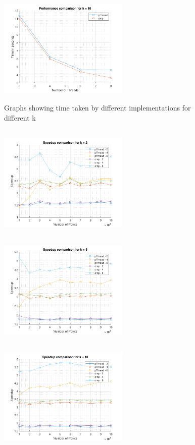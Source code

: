 \documentclass[letter, 11pt, margin=1in]{article}
\begin{document}
\begin{figure}[H]
    \includegraphics[width=6.2cm,height=5.5cm]{tk10}
    \caption{Graphs showing time taken by different implementations for different k}
    \label{fig:time}
\end{figure}

\begin{figure}[H]
    \centering
    \includegraphics[width=6.2cm,height=5.5cm]{sk2}
    \includegraphics[width=6.2cm,height=5.5cm]{sk5}
    \includegraphics[width=6.2cm,height=5.5cm]{sk10}\\

\end{figure}
\end{document}
